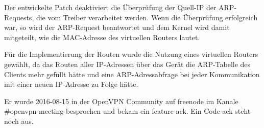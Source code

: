 Der entwickelte Patch deaktiviert die Überprüfung der Quell-IP der \ac{ARP}-Requests, die
vom Treiber verarbeitet werden. Wenn die Überprüfung erfolgreich war, so wird der ARP-Request
beantwortet und dem Kernel wird damit mitgeteilt, wie die MAC-Adresse des virtuellen Routers lautet.

Für die Implementierung der Routen wurde die Nutzung eines virtuellen Routers gewählt,
da das Routen aller \ac{IP}-Adressen über das Gerät die \ac{ARP}-Tabelle des Clients
mehr gefüllt hätte und eine \ac{ARP}-Adressabfrage bei jeder Kommunikation mit einer neuen
\ac{IP}-Adresse zu Folge hätte.

Er wurde 2016-08-15 in der OpenVPN Community auf freenode im Kanale \#openvpn-meeting besprochen
und bekam ein feature-ack. Ein Code-ack steht noch aus.

